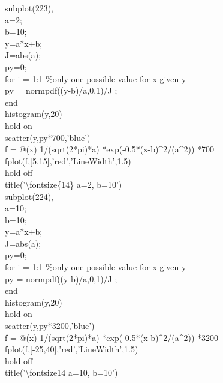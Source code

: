 \documentclass[twoside,twocolumn]{article}
\begin{document}
\begin{itshape}
subplot(223),\\
a=2;\\
b=10;\\
y=a*x+b;\\
J=abs(a);\\
py=0;\\
for i = 1:1 \%only one possible value for x given y\\
    py = normpdf((y-b)/a,0,1)/J ;\\
end\\
histogram(y,20)\\
hold on\\
scatter(y,py*700,'blue')\\
f = @(x) 1/(sqrt(2*pi)*a) *exp(-0.5*(x-b)\^{}2/(a\^{}2)) *700\\
fplot(f,[5,15],'red','LineWidth',1.5)\\
hold off\\
title('\textbackslash fontsize\{14\} a=2, b=10')\\

subplot(224),\\
a=10;\\
b=10;\\
y=a*x+b;\\
J=abs(a);\\
py=0;\\
for i = 1:1 \%only one possible value for x given y\\
    py = normpdf((y-b)/a,0,1)/J ;\\
end\\
histogram(y,20)\\
hold on\\
scatter(y,py*3200,'blue')\\
f = @(x) 1/(sqrt(2*pi)*a) *exp(-0.5*(x-b)\^{}2/(a\^{}2)) *3200\\
fplot(f,[-25,40],'red','LineWidth',1.5)\\
hold off\\
title('\textbackslash fontsize{14} a=10, b=10')\\

\end{itshape}
\end{document}
